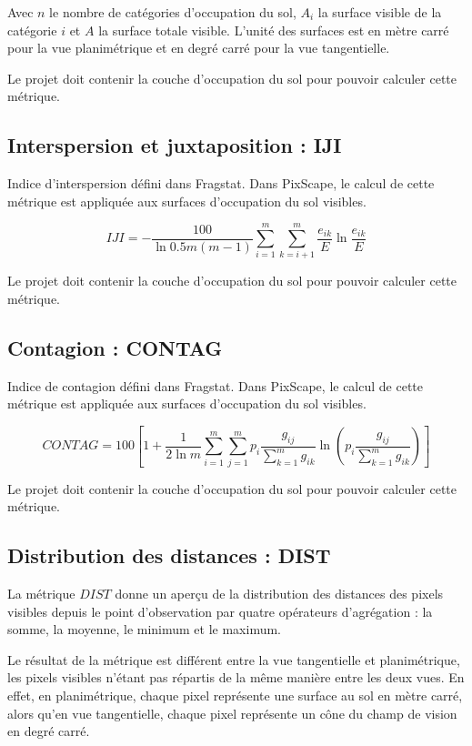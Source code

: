 \documentclass{report}
\begin{document}
Avec $n$ le nombre de catégories d'occupation du sol, $A_i$ la surface visible de la catégorie $i$ et $A$ la surface totale visible. L'unité des surfaces est en mètre carré pour la vue planimétrique et en degré carré pour la vue tangentielle.

Le projet doit contenir la couche d'occupation du sol pour pouvoir calculer cette métrique.

\subsection{Interspersion et juxtaposition : IJI}
Indice d'interspersion défini dans Fragstat. Dans PixScape, le calcul de cette métrique est appliquée aux surfaces d'occupation du sol visibles.

$$ IJI =  -\frac{100}{\ln 0.5 m(m-1)} \sum_{i=1}^{m} \sum_{k=i+1}^{m}     \dfrac{e_{ik}}{E} \ln \dfrac{e_{ik}}{E}    $$

Le projet doit contenir la couche d'occupation du sol pour pouvoir calculer cette métrique.

\subsection{Contagion : CONTAG}
Indice de contagion défini dans Fragstat. Dans PixScape, le calcul de cette métrique est appliquée aux surfaces d'occupation du sol visibles.

$$ CONTAG = 100 \left[1+\dfrac{1}{2\ln m} \sum _{i=1}^{m}  \sum _{j=1}^{m}  p_i\dfrac{g_{ij}}{\sum _{k=1}^{m}g_{ik} }   \ln \left( p_i\dfrac{g_{ij}}{\sum _{k=1}^{m}g_{ik} }\right)  \right]$$

Le projet doit contenir la couche d'occupation du sol pour pouvoir calculer cette métrique.

\subsection{Distribution des distances : DIST}

La métrique $DIST$ donne un aperçu de la distribution des distances des pixels visibles depuis le point d'observation par quatre opérateurs d'agrégation : la somme, la moyenne, le minimum et le maximum.

Le résultat de la métrique est différent entre la vue tangentielle et planimétrique, les pixels visibles n'étant pas répartis de la même manière entre les deux vues. En effet, en planimétrique, chaque pixel représente une surface au sol en mètre carré, alors qu'en vue tangentielle, chaque pixel représente un cône du champ de vision en degré carré.
\end{document}
